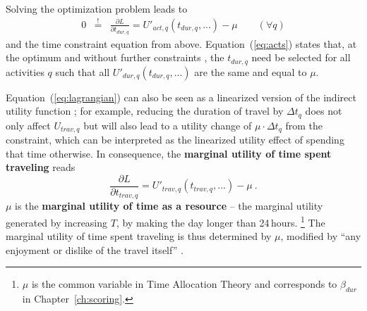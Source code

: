Solving the optimization problem leads to
\begin{eqnarray}
0 & \stackrel!= & \frac{\partial L}{\partial t_{dur,q}} = U'_{act,q}(t_{dur,q},...) - \mu 
%
\qquad (\forall q)
\label{eq:acts}
\end{eqnarray}
and the time constraint equation from above.
%
Equation~(\ref{eq:acts}) states that, at the optimum and without further constraints%
%
%
, the $t_{dur,q}$ need be selected for all activities $q$ such that all $U'_{dur,q}(t_{dur,q},...)$ are the same and equal to $\mu$.

Equation~(\ref{eq:lagrangian}) can also be seen as a linearized version of the indirect utility function
%
%
%
%
%
; for example, reducing the duration of travel by $\Delta t_q$ does not only affect $U_{trav,q}$ but will also lead to a utility change of $ \mu \cdot \Delta t_q$ from the constraint, which can be interpreted as the linearized utility effect of spending that time otherwise.
%
In consequence, the \textbf{marginal utility of time spent traveling} reads
%
\begin{equation}
\frac{\partial L}{\partial t_{trav,q}} = U'_{trav,q}(t_{trav,q},...) - \mu \ .
\label{eq:marg-UoT}
\end{equation}
%
$\mu$ is the \textbf{marginal utility of time as a resource} -- the marginal utility generated by increasing $T$, \ie by making the day longer than 24\,hours.%
%
\footnote{
%
$\mu$ is the common variable in Time Allocation Theory and corresponds to $\beta_{dur}$ in Chapter~\ref{ch:scoring}.
%
}
%
The marginal utility of time spent traveling is thus determined by $\mu$, modified by ``any enjoyment or dislike of the travel itself'' \citep{Small2012ValuationOfTimeRevisited}.

